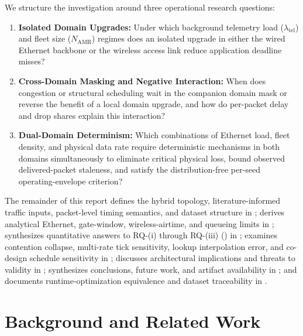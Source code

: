 \documentclass[11pt,a4paper]{article}
\newcommand{\Namr}{\ensuremath{N_{\mathrm{AMR}}}}
\newcommand{\ltel}{\ensuremath{\lambda_{\mathrm{tel}}}}
\begin{document}
We structure the investigation around three operational research questions:
\begin{enumerate}[label=\textbf{RQ-(\roman*)}, leftmargin=3.8em]
    \item \textbf{Isolated Domain Upgrades:} Under which background telemetry load ($\ltel$) and fleet size ($\Namr$) regimes does an isolated upgrade in either the wired Ethernet backbone or the wireless access link reduce application deadline misses?
    \item \textbf{Cross-Domain Masking and Negative Interaction:} When does congestion or structural scheduling wait in the companion domain mask or reverse the benefit of a local domain upgrade, and how do per-packet delay and drop shares explain this interaction?
    \item \textbf{Dual-Domain Determinism:} Which combinations of Ethernet load, fleet density, and physical data rate require deterministic mechanisms in both domains simultaneously to eliminate critical physical loss, bound observed delivered-packet staleness, and satisfy the distribution-free per-seed operating-envelope criterion?
\end{enumerate}

The remainder of this report defines the hybrid topology, literature-informed traffic inputs, packet-level timing semantics, and dataset structure in ; derives analytical Ethernet, gate-window, wireless-airtime, and queueing limits in ; synthesizes quantitative answers to RQ-(i) through RQ-(iii) () in ; examines contention collapse, multi-rate tick sensitivity, lookup interpolation error, and co-design schedule sensitivity in ; discusses architectural implications and threats to validity in ; synthesizes conclusions, future work, and artifact availability in ; and documents runtime-optimization equivalence and dataset traceability in .

\section{Background and Related Work}
\label{sec:related_work}
\end{document}
